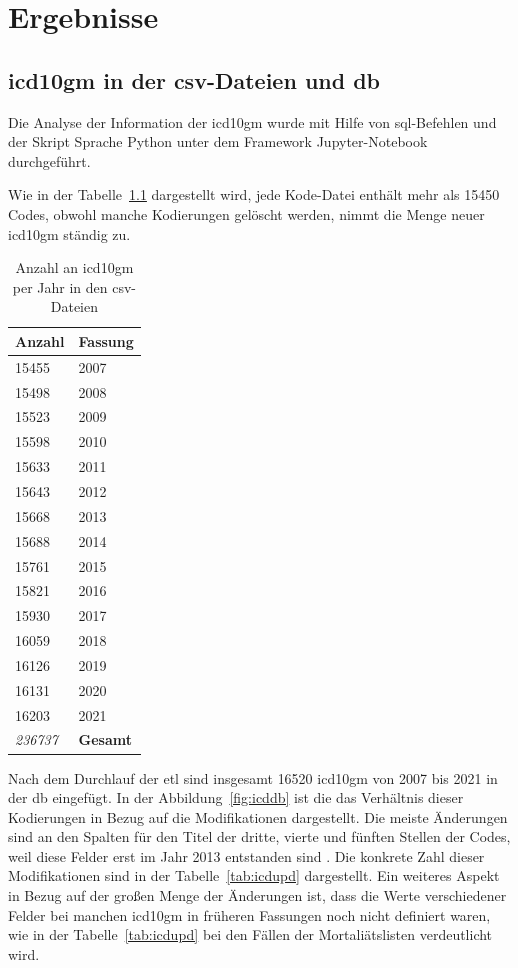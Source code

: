 \chapter{Ergebnisse} \label{ch:results}

\section{\acs{icd10gm} in der \acs{csv}-Dateien und \acs{db}} \label{sec:dataanalysis}
Die Analyse der Information der \ac{icd10gm} wurde mit Hilfe von \ac{sql}-Befehlen und der Skript Sprache Python unter dem Framework Jupyter-Notebook durchgeführt.

Wie in der Tabelle~\ref{tab:icdfiles} dargestellt wird, jede Kode-Datei enthält mehr als \textsf{15450} Codes, obwohl manche Kodierungen gelöscht werden, nimmt die Menge neuer \ac{icd10gm} ständig zu.

\begin{table}[ht]
	\centering
	\small
	\caption[\acs{icd10gm} in den \acs{csv}-Dateien]{Anzahl an \acs{icd10gm} per Jahr in den \ac{csv}-Dateien}
	\label{tab:icdfiles}
	\begin{tabular}{|l|l|}
		\hline
	\rowcolor{lightgray} Anzahl & Fassung \\ \hline 
		15455 & 2007 \\ \hline
		15498 & 2008 \\ \hline
		15523 & 2009 \\ \hline
		15598 & 2010 \\ \hline
		15633 & 2011 \\ \hline
		15643 & 2012 \\ \hline
		15668 & 2013 \\ \hline
		15688 & 2014 \\ \hline
		15761 & 2015 \\ \hline
		15821 & 2016 \\ \hline
		15930 & 2017 \\ \hline
		16059 & 2018 \\ \hline
		16126 & 2019 \\ \hline
		16131 & 2020 \\ \hline
		16203 & 2021 \\ \hline
		\hline
		\textit{236737} & \textbf{Gesamt} \\ \hline
	\end{tabular}
	\end{table}

Nach dem Durchlauf der \ac{etl} sind insgesamt \textsf{16520} \ac{icd10gm} von 2007 bis 2021 in der \ac{db} eingefügt. In der Abbildung~\ref{fig:icddb} ist die das Verhältnis dieser Kodierungen in Bezug auf die Modifikationen dargestellt. Die meiste Änderungen sind an den Spalten für den Titel der dritte, vierte und fünften Stellen der Codes, weil diese Felder erst im Jahr 2013 entstanden sind \cite{readme13}. Die konkrete Zahl dieser Modifikationen sind in der Tabelle~\ref{tab:icdupd} dargestellt. Ein weiteres Aspekt in Bezug auf der großen Menge der Änderungen ist, dass die Werte verschiedener Felder bei manchen \ac{icd10gm} in früheren Fassungen noch nicht definiert waren, wie in der Tabelle~\ref{tab:icdupd} bei den Fällen der Mortaliätslisten verdeutlicht wird.
 
